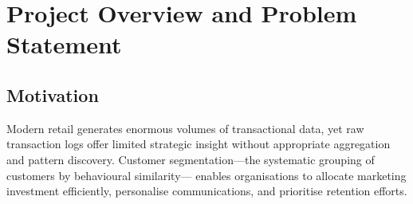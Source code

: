 \documentclass[10pt,a4paper]{article}
\begin{document}
\begin{titlepage}
  \begin{abstract}
    \noindent
    This project applies unsupervised statistical learning techniques to segment
    customers of a UK-based online retailer using transactional data from 2010--2011.
    Starting from 541,909 raw transaction records, we engineer a rich eight-dimensional
    feature space grounded in the RFM (Recency, Frequency, Monetary) framework and
    supplemented by behavioral metrics.  After rigorous preprocessing, log-transformation,
    and standardisation, Principal Component Analysis reduces the feature space to four
    orthogonal components explaining 93.59\% of total variance.  Three clustering
    algorithms---K-Means, Agglomerative Hierarchical, and DBSCAN---are compared
    using Silhouette Score, Davies-Bouldin Index, and Calinski-Harabasz Index.
    K-Means with $k{=}3$ is selected as the preferred model, yielding three well-separated,
    actionable segments: \emph{Hibernating}, \emph{Active/Loyal}, and \emph{Champions}.
    The Champion segment (30.2\% of customers) drives 82\% of total revenue.  A
    supervised Logistic Regression validation achieves 99.65\% test accuracy, confirming
    the statistical coherence of the discovered segments.  Business recommendations
    for targeted retention, growth, and reactivation strategies are provided for each segment.
  \end{abstract}

\end{titlepage}
{
\small
\setlength{\parskip}{-0.5pt}
\tableofcontents
}
\clearpage

\section{Project Overview and Problem Statement}

\subsection{Motivation}

Modern retail generates enormous volumes of transactional data, yet raw transaction logs
offer limited strategic insight without appropriate aggregation and pattern discovery.
Customer segmentation---the systematic grouping of customers by behavioural similarity---
enables organisations to allocate marketing investment efficiently, personalise
communications, and prioritise retention efforts.
\end{document}
